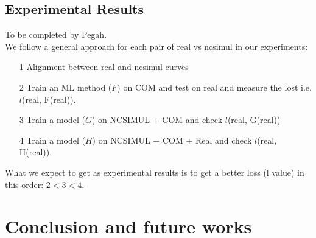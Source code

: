 \documentclass{article}
\begin{document}
\subsection{Experimental Results}
To be completed by Pegah. \\
We follow a general approach for each pair of real vs ncsimul in our experiments:
\begin{itemize}
\item[1] Alignment between real and ncsimul curves
\item[2] Train an ML method ($F$) on COM and test on real and measure the lost i.e. $l$(real, F(real)).
\item[3] Train a model ($G$) on NCSIMUL + COM and check $l$(real, G(real))
\item[4] Train a model ($H$) on NCSIMUL + COM + Real and check $l$(real, H(real)).
\end{itemize}
What we expect to get as experimental results is to get a better loss (l value) in this order: $2 < 3 < 4$. 
\section{Conclusion and future works}



\end{document}

